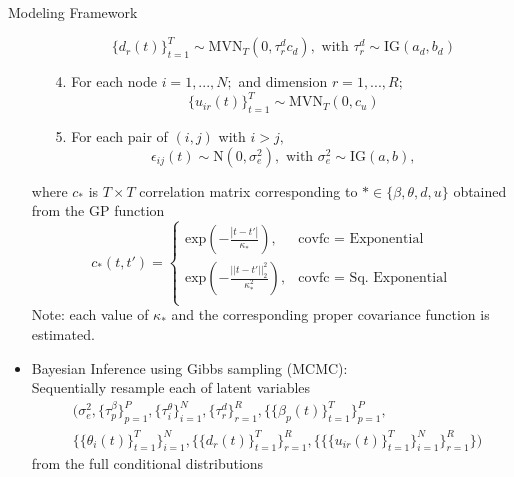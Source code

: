 \documentclass[serif,mathserif,final,table]{beamer}
\begin{document}
\begin{frame}{}
\begin{columns}[t]
\begin{column}{0.235\linewidth}
\begin{block}{Modeling Framework}
\begin{itemize}
\begin{enumerate}
         	 $$\{d_{r}(t)\}_{t=1}^T  \sim \mbox{MVN}_{T}(0, \tau^{d}_rc_d), \mbox{ with } \tau^{d}_r \sim \mbox{IG}(a_d, b_d)$$
         	\item[4.] For each node $i=1,...,N;$ and dimension $r=1,...,R;$ 
         	$$\{u_{ir}(t)\}_{t=1}^T \sim \mbox{MVN}_{T}(0, c_u)$$
         	\item[5.] For each pair of $(i, j)$ with $i > j,$
         	$$\epsilon_{ij}(t) \sim \mbox{N}(0, \sigma_e^2), \mbox{ with } \sigma_e^2 \sim \mbox{IG}(a, b),$$
            \end{enumerate}
            where $c_*$ is $T \times T$ correlation matrix corresponding to $* \in \{\beta, \theta, d, u\}$ obtained from the GP function 
            \begin{equation*}
c_*(t, t')=\begin{cases}
\mbox{exp}(-\frac{|t-t'|}{\kappa_*}), & \mbox{covfc = Exponential}\\
\mbox{exp}(-\frac{||t-t'||_2^2}{\kappa_*^2}), & \mbox{covfc = Sq. Exponential}\\
\end{cases}
            \end{equation*}
            Note: each value of $\kappa_*$ and the corresponding proper covariance function is estimated. 
                        \vspace{10pt}
                        \item Bayesian Inference using Gibbs sampling (MCMC):\\
                        Sequentially resample each of latent variables
                        \begin{equation*}
                        \begin{aligned}
                      	&\Big(\sigma_e^2, \{\tau^{\beta}_p\}_{p=1}^P, \{\tau^{\theta}_i\}_{i=1}^N, \{\tau^{d}_r\}_{r=1}^R, \{\{\beta_{p}(t)\}_{t=1}^T\}_{p=1}^P, \\& \{\{\theta_{i}(t)\}_{t=1}^T\}_{i=1}^N, \{\{d_{r}(t)\}_{t=1}^T \}_{r=1}^R, \{\{\{u_{ir}(t)\}_{t=1}^T\}_{i=1}^N\}_{r=1}^R\}\Big)
                        \end{aligned}                        
\end{equation*}
                        from the full conditional distributions
        \end{itemize}
            \end{block}
     

    \end{column}


\end{columns}
\end{frame}
\end{document}
